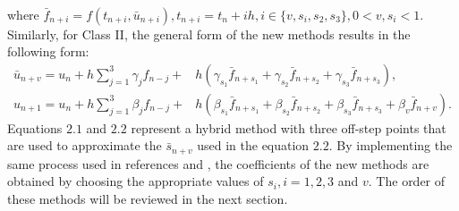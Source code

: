 ‎\documentclass[a4paper,10pt]{article}‎
\begin{document}
where
 $ \bar{f}_{n+i}=f(t_{n+i}, \bar{u}_{n+i}), t_{n+i}=t_{n}+i h, i\in \{v, s_{i}, s_{2}, s_{3}\}, 0<v, s_{i}<1.$
 Similarly, for Class II, the general form of the new methods results in the following form: 
  \begin{align}
 \bar{u}_{n+v}=u_{n}+h\sum_{j=1}^{3}\gamma_{j}f_{n-j}+ &  h(\gamma_{s_{1}}\bar{f}_{n+s_{1}}+\gamma_{s_{2}}\bar{f}_{n+s_{2}}+\gamma_{s_{3}}\bar{f}_{n+s_{3}}), \label{2.2}\\
u_{n+1}=u_{n}+h\sum_{j=1}^{3}\beta_{j}f_{n-j}+ &  h(\beta_{s_{1}}\bar{f}_{n+s_{1}}+\beta_{s_{2}}\bar{f}_{n+s_{2}}+\beta_{s_{3}}\bar{f}_{n+s_{3}}+\beta_{v}\bar{f}_{n+v}). \label{2.3}
\end{align}
  Equations $2.1$ and $2.2$ represent a hybrid method with three off-step points that are used to approximate the $\bar{s}_{n+v}$  used in the  equation $2.2$.
By implementing the same process used in references \cite{ALI6}  and \cite{ALI1,ALI5}, the coefficients of the new methods are obtained by choosing the appropriate values ​​of $s_{i}, i=1,2,3$ and $v$. The order of these methods will be reviewed in the next section.


\end{document}
